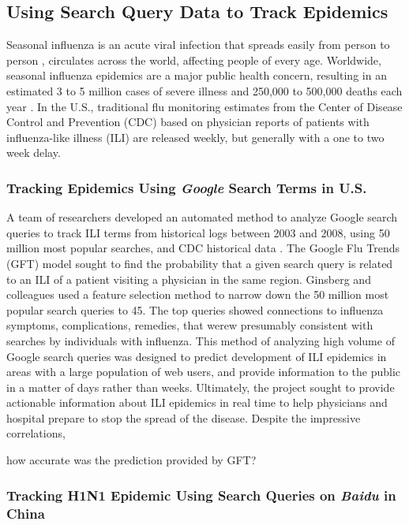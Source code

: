 \documentclass[sigconf]{acmart}
\begin{document}
\subsection{Using Search Query Data to Track Epidemics}

Seasonal influenza is an acute viral infection that spreads easily from person to person , circulates across the world, affecting people of every age. Worldwide, seasonal influenza epidemics are a major public health concern, resulting in an estimated 3 to 5 million cases of severe illness and 250,000 to 500,000 deaths each year \cite{who16}. In the U.S., traditional flu monitoring estimates from the Center of Disease Control and Prevention (CDC) based on physician reports of patients with influenza-like illness (ILI) are released weekly, but generally with a one to two week delay.

\subsubsection{Tracking Epidemics Using {\itshape Google} Search Terms in U.S.}

A team of researchers developed an automated method to analyze Google search queries to track ILI terms from historical logs between 2003 and 2008, using 50 million most popular searches, and CDC historical data \cite{ginsberg09}. The Google Flu Trends (GFT) model sought to find the probability that a given search query is related to an ILI of a patient visiting a physician in the same region. Ginsberg and colleagues used a feature selection method to narrow down the 50 million most popular search queries to 45. The top queries showed connections to influenza symptoms, complications, remedies, that werew presumably consistent with searches by individuals with influenza. This method of analyzing high volume of Google search queries was designed to predict development of ILI epidemics in areas with a large population of web users, and provide information to the public in a matter of days rather than weeks. Ultimately, the project sought to provide actionable information about ILI epidemics in real time to help physicians and hospital prepare to stop the spread of the disease. Despite the impressive correlations, 

how accurate was the prediction provided by GFT?

\subsubsection{Tracking H1N1 Epidemic Using Search Queries on {\itshape Baidu} in China }
\end{document}
